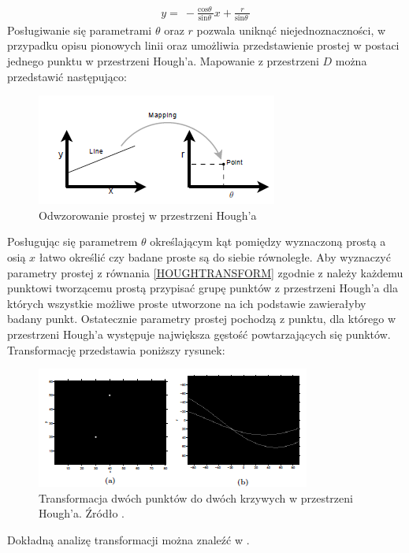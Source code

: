 \documentclass[12pt, twoside, openany]{report}
\theoremstyle{definition}
\begin{document}
\begin{align}
y=\ -\frac{{\mathrm{cos} \theta \ }}{{\mathrm{sin} \theta \ }}x+\frac{r}{{\mathrm{sin} \theta \ }}
\label{HOUGHTRANSFORM}
\end{align}
Posługiwanie się parametrami $\theta $ oraz $r$ pozwala uniknąć niejednoznaczności, w przypadku opisu pionowych linii oraz umożliwia przedstawienie prostej w postaci jednego punktu w przestrzeni Hough'a. Mapowanie z przestrzeni $D$ można przedstawić następująco:
\begin{figure}[!h]
	\centering
	\includegraphics[scale=1]{rysunki/4_fig7}
	\caption{Odwzorowanie prostej w przestrzeni Hough’a}
\label{4_fig7}
\end{figure}
Posługując się parametrem $\theta$ określającym kąt pomiędzy wyznaczoną prostą a osią $x$ łatwo określić czy badane proste są do siebie równoległe. Aby wyznaczyć parametry prostej z równania \eqref{HOUGHTRANSFORM} zgodnie z \cite{houghTransform} należy każdemu punktowi tworzącemu prostą przypisać grupę punktów z przestrzeni Hough'a dla których wszystkie możliwe proste utworzone na ich podstawie zawierałyby badany punkt. Ostatecznie parametry prostej pochodzą z punktu, dla którego w przestrzeni Hough'a występuje największa gęstość powtarzających się punktów. Transformację przedstawia poniższy rysunek:
\begin{figure}[!h]
	\centering
	\includegraphics[scale=1]{rysunki/4_fig8}
	\caption{Transformacja dwóch punktów do dwóch krzywych w przestrzeni Hough'a. Źródło \cite{houghTransform}.}
\label{4_fig8}
\end{figure}
Dokładną analizę transformacji można znaleźć w \cite{houghTransform}.
\end{document}
